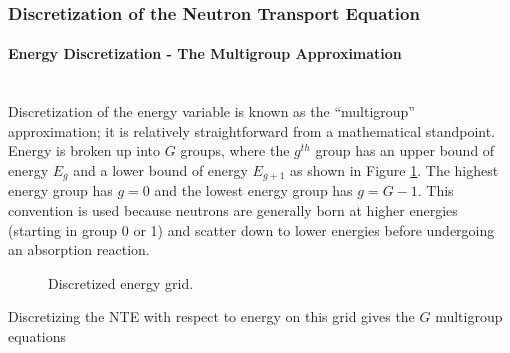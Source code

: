 \subsubsection{Discretization of the Neutron Transport Equation}
\label{sec:disc}

\paragraph{Energy Discretization - The Multigroup Approximation}\mbox{} \\

Discretization of the energy variable is known as the ``multigroup'' approximation; 
it is relatively straightforward from a mathematical standpoint. Energy is broken up into $G$ 
groups, where the $g^{th}$ group has an upper bound of energy
$E_g$ and a lower bound of energy $E_{g+1}$ as shown in Figure \ref{egrid}. The highest energy 
group has $g = 0$ and the lowest energy group has $g = G-1$. This convention is used because 
neutrons are generally born at higher energies (starting in group 0 or 1) and scatter down to 
lower energies before undergoing an absorption reaction.

\begin{figure}[!thb]
\centering
{}
\caption{Discretized energy grid.}
\label{egrid}
\end{figure}

\FloatBarrier
Discretizing the NTE with respect to energy on this grid gives the $G$ multigroup
equations

